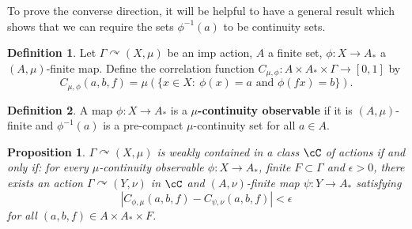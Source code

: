 \documentclass[12pt]{article}
\theoremstyle{plain}
\newtheorem{prop}[thm]{Proposition}
\newtheorem{cor}[thm]{Corollary}
\theoremstyle{definition}
\newtheorem{defn}{Definition}
\theoremstyle{remark}
\newcommand{\G}{\Gamma}
\newcommand{\eps}{\epsilon}
\newcommand\z{\zeta}
\def\cc{{\curvearrowright}}
\begin{document}




To prove the converse direction,  it will be helpful to have a general result which shows that we can require the sets $\phi^{-1}(a)$ to be continuity sets.

\begin{defn}
    Let $\G \cc (X,\mu)$ be an imp action, $A$ a finite set, $\phi:X \to A_*$ a $(A,\mu)$-finite map. Define the correlation function $C_{\mu,\phi}:A \times A_* \times \G \to [0,1]$ by
    $$C_{\mu,\phi}(a,b,f) = \mu(\{x\in X:~ \phi(x)=a \textrm{ and } \phi(fx) = b\}).$$
\end{defn}

\begin{defn}
    A map $\phi:X \to A_*$ is a {\bf $\mu$-continuity observable} if it is $(A,\mu)$-finite and $\phi^{-1}(a)$ is a pre-compact $\mu$-continuity set for all $a\in A$.
\end{defn}

\begin{prop}\label{P:continuity-observables}
    $\G \cc (X,\mu)$ is weakly contained in a class $\cC$ of actions if and only if: for every $\mu$-continuity observable $\phi: X \to A_*$, finite $F \subset \G$ and $\eps>0$, there exists an action $\G \cc (Y,\nu)$ in $\cC$ and $(A,\nu)$-finite map $\psi:Y \to A_*$ satisfying
 $$|C_{\phi,\mu}(a,b,f) - C_{\psi,\nu}(a,b,f)|<\eps$$
for all $(a,b,f) \in A \times A_*\times F$.    
\end{prop}
\end{document}
